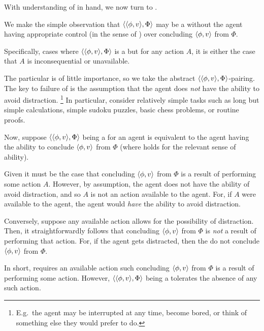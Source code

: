 \begin{note}
  With understanding of \AbControl{} in hand, we now turn to .

  We make the simple observation that \(\langle \langle \phi, v \rangle, \Phi \rangle\) may be a \fc{} without the agent having appropriate control (in the sense of \AbControl{}) over concluding \(\langle \phi, v \rangle\) from \(\Phi\).

  Specifically, cases where \(\langle \langle \phi, v \rangle, \Phi \rangle\) is a \fc{} but for any action \(A\), it is either the case that \(A\) is inconsequential or unavailable.

  The particular \fc{} is of little importance, so we take the abstract \(\langle \langle \phi, v \rangle, \Phi \rangle\)-pairing.
  The key to failure of \AbControl{} is the assumption that the agent does \emph{not} have the ability to avoid distraction.%
  \footnote{
    E.g.\ the agent may be interrupted at any time, become bored, or think of something else they would prefer to do.
  }
  In particular, consider relatively simple tasks such as long but simple calculations, simple sudoku puzzles, basic chess problems, or routine proofs.

  Now, suppose \(\langle \langle \phi, v \rangle, \Phi \rangle\) being a  for an agent is equivalent to the agent having the ability to conclude \(\langle \phi, v \rangle\) from \(\Phi\) (where \AbControl{} holds for the relevant sense of ability).

  Given \AbControl{} it must be the case that concluding \(\langle \phi, v \rangle\) from \(\Phi\) is a result of performing some action \(A\).
  However, by assumption, the agent does not have the ability of avoid distraction, and so \(A\) is not an action available to the agent.
  For, if \(A\) were available to the agent, the agent would \emph{have} the ability to avoid distraction.

  Conversely, suppose any available action allows for the possibility of distraction.
  Then, it straightforwardly follows that concluding \(\langle \phi, v \rangle\) from \(\Phi\) is \emph{not} a result of performing that action.
  For, if the agent gets distracted, then the do not conclude \(\langle \phi, v \rangle\) from \(\Phi\).

  In short, \AbControl{} requires an available action such concluding \(\langle \phi, v \rangle\) from \(\Phi\) is a result of performing some action.
  However, \(\langle \langle \phi, v \rangle, \Phi \rangle\) being a \fc{} tolerates the absence of any such action.


\end{note}

